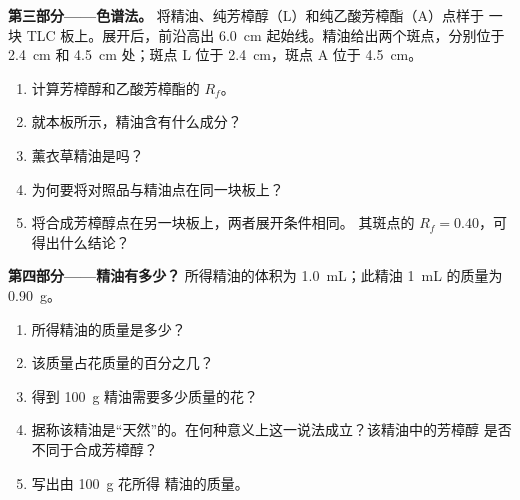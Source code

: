 \begin{problem}
\medskip
\noindent\textbf{第三部分——色谱法。}
将精油、纯芳樟醇（L）和纯乙酸芳樟酯（A）点样于
一块 TLC 板上。展开后，前沿高出 \qty{6.0}{cm}
起始线。精油给出两个斑点，分别位于 \qty{2.4}{cm} 和
\qty{4.5}{cm} 处；斑点 L 位于 \qty{2.4}{cm}，斑点 A 位于 \qty{4.5}{cm}。
\begin{enumerate}[resume]
  \item 计算芳樟醇和乙酸芳樟酯的 $R_f$。
  \item 就本板所示，精油含有什么成分？
  \item 薰衣草精油是吗？
  \item 为何要将对照品与精油点在同一块板上？
  \item 将合成芳樟醇点在另一块板上，两者展开条件相同。
        其斑点的 $R_f = 0.40$，可得出什么结论？
\end{enumerate}

\medskip
\noindent\textbf{第四部分——精油有多少？}
所得精油的体积为 \qty{1.0}{mL}；此精油
\qty{1}{mL} 的质量为 \qty{0.90}{g}。
\begin{enumerate}[resume]
  \item 所得精油的质量是多少？
  \item 该质量占花质量的百分之几？
  \item 得到 \qty{100}{g} 精油需要多少质量的花？
  \item 据称该精油是“天然”的。在何种意义上这一说法成立？该精油中的芳樟醇
        是否不同于合成芳樟醇？
  \item 写出由 \qty{100}{g} 花所得
        精油的质量。
\end{enumerate}
\end{problem}
